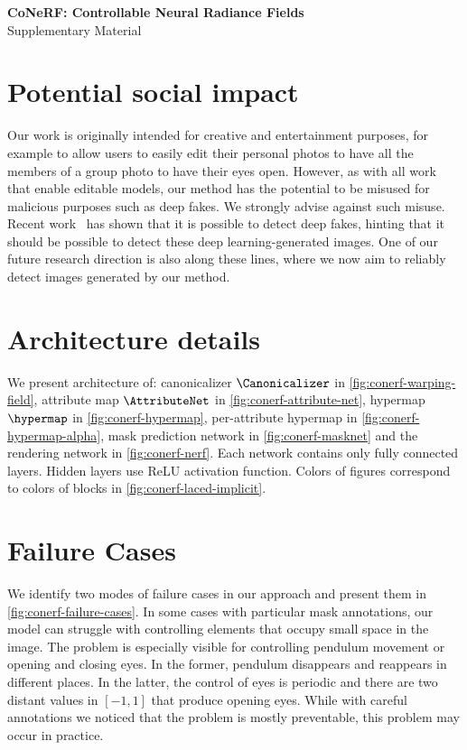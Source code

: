 {
\vspace{2.0em}
\centering
\Large
\textbf{CoNeRF: Controllable Neural Radiance Fields} \\
\vspace{0.5em}
 Supplementary Material \\ \vspace{1.0em} }

 \section{Potential social impact} Our work is originally intended for
 creative and entertainment purposes, for example to allow users to easily
 edit their personal photos to have all the members of a group photo to have
 their eyes open.
  However, as with all work that enable editable models, our method has the
  potential to be misused for malicious purposes such as deep fakes.
  We strongly advise against such misuse.
  Recent work~\cite{asnani2021reverse} has shown that it is possible to detect
  deep fakes, hinting that it should be possible to detect these deep
  learning-generated images.
  One of our future research direction is also along these lines, where we now
  aim to reliably detect images generated by our method.

\section{Architecture details}
  We present architecture of: canonicalizer $\Canonicalizer$ in
  \cref{fig:conerf-warping-field}, attribute map $\AttributeNet$ in
  \cref{fig:conerf-attribute-net}, hypermap $\hypermap$ in
  \cref{fig:conerf-hypermap}, per-attribute hypermap in
  \cref{fig:conerf-hypermap-alpha}, mask prediction network in
  \cref{fig:conerf-masknet} and the rendering network in
  \cref{fig:conerf-nerf}.
  Each network contains only fully connected layers.
  Hidden layers use ReLU activation function.
  Colors of figures correspond to colors of blocks in
  \cref{fig:conerf-laced-implicit}.

\section{Failure Cases}
  
  We identify two modes of failure cases in our approach and present them in
  \cref{fig:conerf-failure-cases}.
  In some cases with particular mask annotations, our model can struggle with
  controlling elements that occupy small space in the image.
  The problem is especially visible for controlling pendulum movement or
  opening and closing eyes.
  In the former, pendulum disappears and reappears in different places.
  In the latter, the control of eyes is periodic and there are two distant
  values in $[-1, 1]$ that produce opening eyes.
  While with careful annotations we noticed that the problem is mostly
  preventable, this problem may occur in practice.

